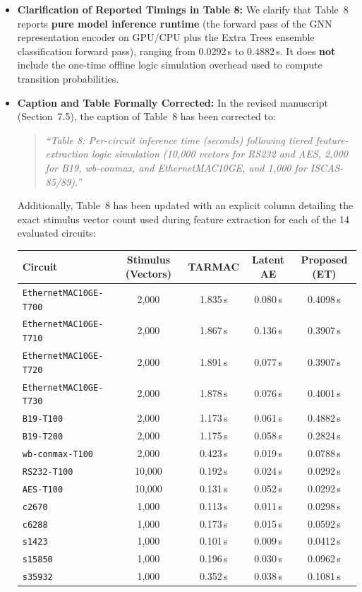 \documentclass[11pt,a4paper]{article}
\begin{document}
\begin{itemize}[leftmargin=*]
    \item \textbf{Clarification of Reported Timings in Table 8:}
    We clarify that Table~8 reports \textbf{pure model inference runtime} (the forward pass of the GNN representation encoder on GPU/CPU plus the Extra Trees ensemble classification forward pass), ranging from 0.0292\,s to 0.4882\,s. It does \textbf{not} include the one-time offline logic simulation overhead used to compute transition probabilities.
    
    \item \textbf{Caption and Table Formally Corrected:} In the revised manuscript (Section~7.5), the caption of Table~8 has been corrected to:
    \begin{quote}
        \textit{``Table 8: Per-circuit inference time (seconds) following tiered feature-extraction logic simulation (10,000 vectors for RS232 and AES, 2,000 for B19, wb-conmax, and EthernetMAC10GE, and 1,000 for ISCAS-85/89).''}
    \end{quote}
    Additionally, Table~8 has been updated with an explicit column detailing the exact stimulus vector count used during feature extraction for each of the 14 evaluated circuits:

\begin{center}
\small
\begin{tabular}{lcccc}
\toprule
\textbf{Circuit} & \textbf{Stimulus (Vectors)} & \textbf{TARMAC} & \textbf{Latent AE} & \textbf{Proposed (ET)} \\
\midrule
\texttt{EthernetMAC10GE-T700} & 2,000 & 1.835\,s & 0.080\,s & 0.4098\,s \\
\texttt{EthernetMAC10GE-T710} & 2,000 & 1.867\,s & 0.136\,s & 0.3907\,s \\
\texttt{EthernetMAC10GE-T720} & 2,000 & 1.891\,s & 0.077\,s & 0.3907\,s \\
\texttt{EthernetMAC10GE-T730} & 2,000 & 1.878\,s & 0.076\,s & 0.4001\,s \\
\texttt{B19-T100} & 2,000 & 1.173\,s & 0.061\,s & 0.4882\,s \\
\texttt{B19-T200} & 2,000 & 1.175\,s & 0.058\,s & 0.2824\,s \\
\texttt{wb-conmax-T100} & 2,000 & 0.423\,s & 0.019\,s & 0.0788\,s \\
\texttt{RS232-T100} & 10,000 & 0.192\,s & 0.024\,s & 0.0292\,s \\
\texttt{AES-T100} & 10,000 & 0.131\,s & 0.052\,s & 0.0292\,s \\
\texttt{c2670} & 1,000 & 0.113\,s & 0.011\,s & 0.0298\,s \\
\texttt{c6288} & 1,000 & 0.173\,s & 0.015\,s & 0.0592\,s \\
\texttt{s1423} & 1,000 & 0.101\,s & 0.009\,s & 0.0412\,s \\
\texttt{s15850} & 1,000 & 0.196\,s & 0.030\,s & 0.0962\,s \\
\texttt{s35932} & 1,000 & 0.352\,s & 0.038\,s & 0.1081\,s \\
\bottomrule
\end{tabular}
\end{center}
\end{itemize}
\end{document}
